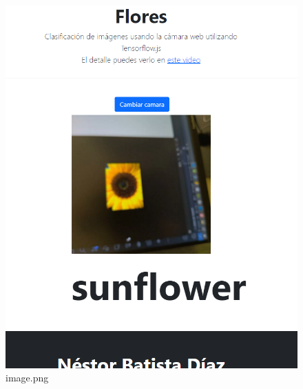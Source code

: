 \documentclass[11pt]{article}
\begin{document}
    \begin{figure}
\centering
\includegraphics{Flores/img/sunflower.png}
\caption{image.png}
\end{figure}


    
    
    
\end{document}
